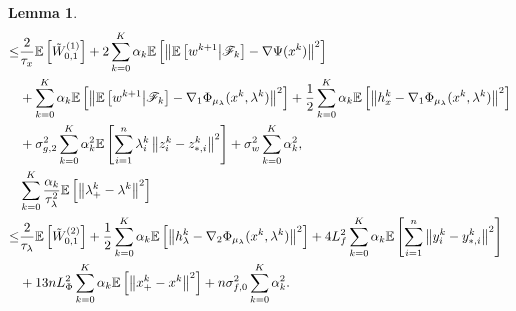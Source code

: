 \documentclass[10pt]{article}
\newtheorem{lemma}{Lemma}[section]
\theoremstyle{remark}
\def\setF{\mathscr{F}} %
\newcommand{\E}{\mathbb{E}}
\newcommand{\norm}[1]{\left\|#1\right\|}
\begin{document}
\begin{lemma}
\begin{align}
            \leq &\frac{2}{\tau_x}\E\left[\tilde W_{0,1}^{(1)}\right] + 2\sum_{k=0}^{K}\alpha_k\E\left[\norm{\E\left[w^{k+1}\middle|\setF_k\right] - \nabla\Psi(x^k)}^2\right]  \notag\\
            & + \sum_{k=0}^{K}\alpha_k\E\left[\norm{\E\left[w^{k+1}\middle|\setF_k\right] -\nabla_1\Phi_{\mu_{\lambda}}(x^k,\lambda^k)}^2\right] +\frac{1}{2}\sum_{k=0}^{K}\alpha_k\E\left[\norm{h_x^k - \nabla_1\Phi_{\mu_{\lambda}}(x^k,\lambda^k)}^2\right] \notag\\
            & + \sigma_{g,2}^2\sum_{k=0}^{K}\alpha_k^2\E\left[\sum_{i=1}^{n}\lambda_i^k\norm{z_i^k - z_{*,i}^k}^2\right] + \sigma_w^2\sum_{k=0}^{K}\alpha_k^2, \notag\\
            &\sum_{k=0}^{K}\frac{\alpha_k}{\tau_{\lambda}^2}\E\left[\norm{\lambda_+^k - \lambda^k}^2\right] \notag\\
            \leq &\frac{2}{\tau_{\lambda}}\E\left[\tilde W_{0,1}^{(2)}\right] + \frac{1}{2}\sum_{k=0}^{K}\alpha_k\E\left[\norm{h_{\lambda}^k - \nabla_2\Phi_{\mu_{\lambda}}(x^k, \lambda^k)}^2\right] + 4L_f^2\sum_{k=0}^{K}\alpha_k\E\left[\sum_{i=1}^{n}\norm{y_i^k-y_{*,i}^k}^2\right] \notag \\
         & + 13nL_{\Phi}^2\sum_{k=0}^{K}\alpha_k\E\left[\norm{x_+^k - x^k}^2\right] + n\sigma_{f,0}^2\sum_{k=0}^{K}\alpha_k^2. \label{ineq: primal_decrease}
    \end{align}
\end{lemma}
\end{document}
